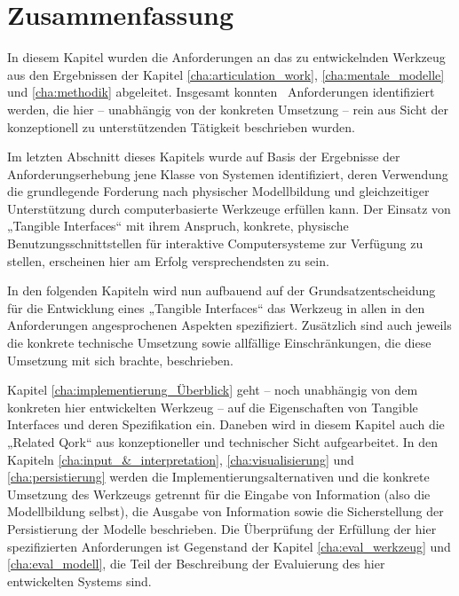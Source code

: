 
\section{Zusammenfassung}
\label{sec:anforderungen_zusammenfassung}

In diesem Kapitel wurden die Anforderungen an das zu entwickelnden Werkzeug aus den Ergebnissen der Kapitel \ref{cha:articulation_work}, \ref{cha:mentale_modelle} und \ref{cha:methodik} abgeleitet. Insgesamt konnten \theanf \ Anforderungen identifiziert werden, die hier -- unabhängig von der konkreten Umsetzung -- rein aus Sicht der konzeptionell zu unterstützenden Tätigkeit beschrieben wurden.

Im letzten Abschnitt dieses Kapitels wurde auf Basis der Ergebnisse der Anforderungserhebung jene Klasse von Systemen identifiziert, deren Verwendung die grundlegende Forderung nach physischer Modellbildung und gleichzeitiger Unterstützung durch computerbasierte Werkzeuge erfüllen kann. Der Einsatz von „Tangible Interfaces“ mit ihrem Anspruch, konkrete, physische Benutzungsschnittstellen für interaktive Computersysteme zur Verfügung zu stellen, erscheinen hier am Erfolg versprechendsten zu sein.

In den folgenden Kapiteln wird nun aufbauend auf der Grundsatzentscheidung für die Entwicklung eines „Tangible Interfaces“ das Werkzeug in allen in den Anforderungen angesprochenen Aspekten spezifiziert. Zusätzlich sind auch jeweils die konkrete technische Umsetzung sowie allfällige Einschränkungen, die diese Umsetzung mit sich brachte, beschrieben.

Kapitel \ref{cha:implementierung_Überblick} geht -- noch unabhängig von dem konkreten hier entwickelten Werkzeug -- auf die Eigenschaften von Tangible Interfaces und deren Spezifikation ein. Daneben wird in diesem Kapitel auch die „Related Qork“ aus konzeptioneller und technischer Sicht aufgearbeitet. In den Kapiteln \ref{cha:input_&_interpretation}, \ref{cha:visualisierung} und \ref{cha:persistierung} werden die Implementierungsalternativen und die konkrete Umsetzung des Werkzeugs getrennt für die Eingabe von Information (also die Modellbildung selbst), die Ausgabe von Information sowie die Sicherstellung der Persistierung der Modelle beschrieben. Die Überprüfung der Erfüllung der hier spezifizierten Anforderungen ist Gegenstand der Kapitel \ref{cha:eval_werkzeug} und \ref{cha:eval_modell}, die Teil der Beschreibung der Evaluierung des hier entwickelten Systems sind.

